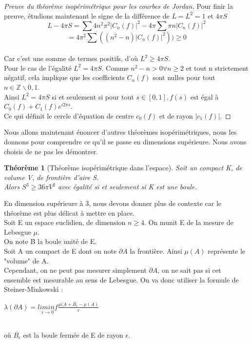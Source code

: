 \documentclass{book}
\newtheorem{theorem}{Théorème}
\newtheorem{proof}{Preuve}
\begin{document}
\begin{proof}[Preuve du théorème isopérimétrique pour les courbes de Jordan]
Pour finir la preuve, étudions maintenant le signe de la différence de $L = L^2 = 1$ et $4 \pi S$
$$L-4 \pi S = \sum 4 n^2 \pi ^2 |C_n(f)|^2 - 4 \pi \sum \pi n |C_n(f)|^2$$
$$= 4 \pi ^2 \sum ((n^2-n) |C_n(f)|^2)) \geq 0$$\\
Car c'est une somme de termes positifs, d'où $L^2 \geq 4 \pi S$.\\
Pour le cas de l'égalité $L^2 = 4 \pi S$. Comme $n^2-n > 0 \forall n \geq 2$ et tout n strictement négatif, cela implique que les coefficients $C_n(f)$ sont nulles pour tout $n \in \mathbb{Z} \backslash {0,1}$.\\
Ainsi $L^2 = 4 \pi S$ si et seulement si pour tout $s \in [0,1], f(s)$ est égal à $C_0(f) +C_1(f) e^{i 2 \pi s}$.\\
Ce qui définit le cercle d'équation de centre $c_0(f)$ et de rayon $|c_1(f)|$.
\end{proof}

{\noindent \textbf{}Nous allons maintenant énoncer d'autres théorèmes isopérimétriques, nous les donnons pour comprendre ce qu'il se passe en dimensions supérieure. Nous avons choisis de ne pas les démontrer.}

\begin{tcolorbox}[colback=green!6]
\begin{theorem}[Théorème isopérimétrique dans l'espace]
Soit un compact K, de volume V, de frontière d'aire S.\\
Alors $S^3 \geq 36 \pi V^2$ avec égalité si et seulement si K est une boule.
\end{theorem}
\end{tcolorbox}

{\noindent En dimension supérieure à 3, nous devons donner plus de contexte car le théorème est plus délicat à mettre en place.}\\
Soit E un espace euclidien, de dimension $n \geq 4$. On munit E de la mesure de Lebesgue $\mu$.\\
On note B la boule unité de E.\\
Soit A un compact de E dont on note $\partial A$ la frontière.
Ainsi $\mu(A)$ représente le "volume" de A.\\
Cependant, on ne peut pas mesurer simplement $\partial A$, on ne sait pas si cet ensemble est mesurable au sens de Lebesgue. On va donc utiliser la formule de Steiner-Minkowski :\\
\centerline{$\lambda( \partial A) = \underset{ \epsilon \rightarrow 0}{liminf} \frac{\mu(A+ \overline{B_\epsilon} - \mu (A)}{\epsilon}$}\\ où $\overline{B_\epsilon}$ est la boule fermée de E de rayon $\epsilon$.
\end{document}
